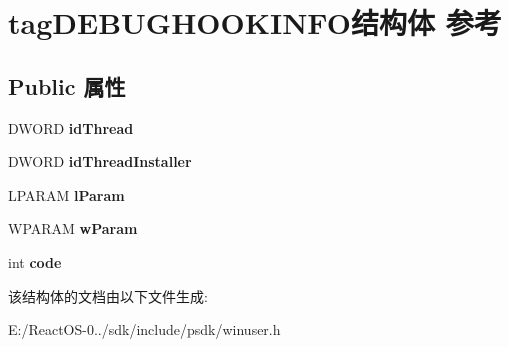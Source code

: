 \hypertarget{structtag_d_e_b_u_g_h_o_o_k_i_n_f_o}{}\section{tag\+D\+E\+B\+U\+G\+H\+O\+O\+K\+I\+N\+F\+O结构体 参考}
\label{structtag_d_e_b_u_g_h_o_o_k_i_n_f_o}
\subsection*{Public 属性}
\begin{DoxyCompactItemize}
\item 
\mbox{\label{structtag_d_e_b_u_g_h_o_o_k_i_n_f_o_a8a3f8b9cfab220bef9ff7ef0c76c168d}} 
D\+W\+O\+RD {\bfseries id\+Thread}
\item 
\mbox{\label{structtag_d_e_b_u_g_h_o_o_k_i_n_f_o_a6c42bfa27f166931f1dd260cfa508f50}} 
D\+W\+O\+RD {\bfseries id\+Thread\+Installer}
\item 
\mbox{\label{structtag_d_e_b_u_g_h_o_o_k_i_n_f_o_a57ab5e8acb0a752c15a3fc8c2db4ec84}} 
L\+P\+A\+R\+AM {\bfseries l\+Param}
\item 
\mbox{\label{structtag_d_e_b_u_g_h_o_o_k_i_n_f_o_a4474f86b5eab7d06c3b8e11bc8b077b6}} 
W\+P\+A\+R\+AM {\bfseries w\+Param}
\item 
\mbox{\label{structtag_d_e_b_u_g_h_o_o_k_i_n_f_o_af916260337e5b32019ae0cc55692ca4f}} 
int {\bfseries code}
\end{DoxyCompactItemize}


该结构体的文档由以下文件生成\+:\begin{DoxyCompactItemize}
\item 
E\+:/\+React\+O\+S-\/0../sdk/include/psdk/winuser.\+h\end{DoxyCompactItemize}
